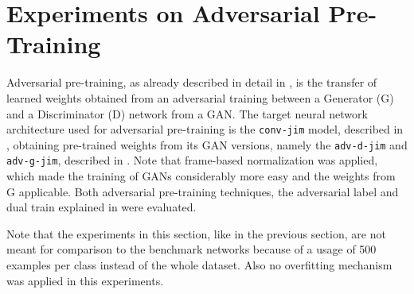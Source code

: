 
\section{Experiments on Adversarial Pre-Training}\label{sec:exp_adv}
Adversarial pre-training, as already described in detail in , is the transfer of learned weights obtained from an adversarial training between a Generator (G) and a Discriminator (D) network from a GAN.
The target neural network architecture used for adversarial pre-training is the \texttt{conv-jim} model, described in , obtaining pre-trained weights from its GAN versions, namely the \texttt{adv-d-jim} and \texttt{adv-g-jim}, described in .
Note that frame-based normalization was applied, which made the training of GANs considerably more easy and the weights from G applicable.
Both adversarial pre-training techniques, the adversarial label and dual train explained in  were evaluated.

Note that the experiments in this section, like in the previous section, are not meant for comparison to the benchmark networks because of a usage of 500 examples per class instead of the whole dataset.
Also no overfitting mechanism was applied in this experiments.




